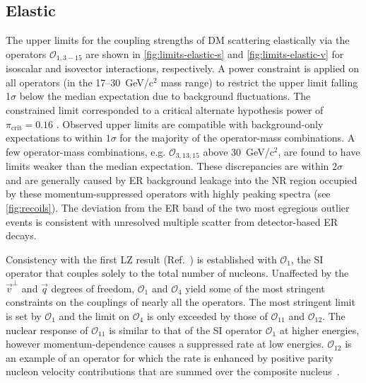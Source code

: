 \documentclass[reprint, showpacs,
preprintnumbers,
amsmath,amssymb,
aps, floatfix,
superscriptaddress,
prd, nofootinbib]{revtex4-1}
\begin{document}
\subsection{Elastic}\label{subsec:elastic}
\par
The upper limits for the coupling strengths of DM scattering elastically via the operators $\mathcal{O}_{1,3-15}$ are shown in \autoref{fig:limits-elastic-s} and \autoref{fig:limits-elastic-v} for isoscalar and isovector interactions, respectively. 
A power constraint is applied on all operators (in the 17--30~GeV/c$^2$ mass range) to restrict the upper limit falling 1$\sigma$ below the median expectation due to background fluctuations. 
The constrained limit corresponded to a critical alternate hypothesis power of $\pi_\text{crit} = 0.16$ \cite{LZ:SR1WS_2022, DM_parameters:BAXTER2021_Conventions, Cowan:2011_power_constraints}.
Observed upper limits are compatible with background-only expectations to within $1\sigma$ for the majority of the operator-mass combinations.
A few operator-mass combinations, e.g. $\mathcal{O}_{3, 13, 15}$ above 30~GeV/c$^2$, are found to have limits weaker than the median expectation.
These discrepancies are within $2\sigma$ and are generally caused by ER background leakage into the NR region occupied by these momentum-suppressed operators with highly peaking spectra (see \autoref{fig:recoils}).
The deviation from the ER band of the two most egregious outlier events is consistent with unresolved multiple scatter from detector-based ER decays.
\par
Consistency with the first LZ result (Ref.~\cite{LZ:SR1WS_2022}) is established with $\mathcal{O}_1$, the SI operator that couples solely to the total number of nucleons.
Unaffected by the $\vec{v}^\perp$ and $\vec{q}$ degrees of freedom, $\mathcal{O}_1$ and $\mathcal{O}_4$ yield some of the most stringent constraints on the couplings of nearly all the operators.
The most stringent limit is set by $\mathcal{O}_1$ and the limit on $\mathcal{O}_4$ is only exceeded by those of $\mathcal{O}_{11}$ and $\mathcal{O}_{12}$. 
The nuclear response of $\mathcal{O}_{11}$ is similar to that of the SI operator $\mathcal{O}_1$ at higher energies, however momentum-dependence causes a suppressed rate at low energies. 
$\mathcal{O}_{12}$ is an example of an operator for which the rate is enhanced by positive parity nucleon velocity contributions that are summed over the composite nucleus~\cite{Anand:MathematicaEFT}. 
\end{document}
